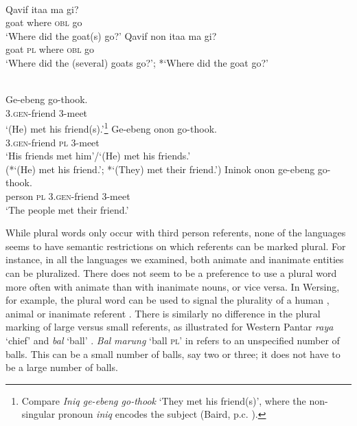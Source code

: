 \ea
\label{bkm:Ref334184518}
 \\
\ea
\gll  Qavif ita{{\textglotstop}}{a} ma gi? \\
 goat where \textsc{obl} go \\
\glt `Where did the goat(s) go?'
\ex
\gll Qavif non ita{{\textglotstop}}a  ma gi? \\
 goat \textsc{pl} where \textsc{obl} go \\
\glt `Where did the (several) goats go?';  *`Where did the goat go?'
\z
\z

\newpage
\ea\label{bkm:Ref354060976}
 \\
  \ea
  \gll Ge-ebeng go-thook. \\
  3.\textsc{gen}-friend 3-meet \\
\glt `(He) met his friend(s).'\footnote{Compare \textit{Iniq ge-ebeng go-thook} `They met his friend(s)', where the non-singular pronoun \textit{iniq} encodes the subject (Baird, p.c. ).}
  \ex
  \gll Ge-ebeng onon go-thook. \\
  3.\textsc{gen}-friend \textsc{pl} 3-meet \\
\glt `His friends met him'/`(He) met his friends.'\\
  (*`(He) met his friend.'; *`(They) met their friend.')
  \ex
  \gll Ininok onon ge-ebeng go-thook. \\
  person  \textsc{pl} 3.\textsc{gen}-friend 3-meet \\
\glt `The people met their friend.'
  \z
\z

While plural words only occur with third person referents, none of the languages seems to have semantic restrictions on which referents can be marked plural. For instance, in all the languages we examined, both animate and inanimate entities can be pluralized. There does not seem to be a preference to use a plural word more often with animate than with inanimate nouns, or vice versa. In Wersing, for example, the plural word can be used to signal the plurality of a human , animal  or inanimate referent . There is similarly no difference in the plural marking of large versus small referents, as illustrated for Western Pantar \textit{raya} `chief'  and \textit{bal} `ball' . \textit{Bal} \textit{marung} `ball \textsc{pl'} in  refers to an unspecified number of balls. This can be a small number of balls, say two or three; it does not have to be a large number of balls.




